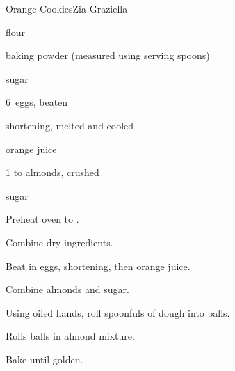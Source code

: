 \begin{recipe}{Orange Cookies\FIXME}{Zia Graziella}{}

\begin{ingredients}
\item {} flour
\item {} baking powder (measured using serving spoons)
\item {} sugar
\item 6~eggs, beaten
\item \lbs{\half} shortening, melted and cooled
\item {} orange juice
\item 1 to  almonds, crushed
\item sugar
\end{ingredients}

\begin{directions}
\item Preheat oven to .
\item Combine dry ingredients.
\item Beat in eggs, shortening, then orange juice.
\item Combine almonds and sugar.
\item Using oiled hands, roll spoonfuls of dough into balls.
\item Rolls balls in almond mixture.
\item Bake until golden. 
\end{directions}

\end{recipe}
